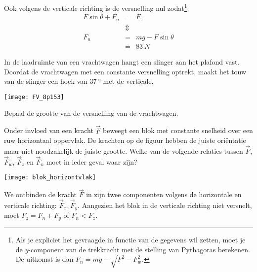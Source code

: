 \documentclass{ximera}
\begin{document}
\begin{exercise}
\begin{oplossing}
	Ook volgens de verticale richting is de versnelling nul zodat\footnote{Als je expliciet het gevraagde in functie van de gegevens wil zetten, moet je de $y$-component van de trekkracht met de stelling van Pythagoras berekenen. De uitkomst is dan $F_n=mg-\sqrt{F^2-F_w^2}$.}:
	\begin{eqnarray*}
		F\sin{\theta}+F_n&=&F_z\\
		&\Updownarrow&\\
		F_n &=& mg-F\sin{\theta}\\
		&=& \SI{83}{N}
	\end{eqnarray*}
	\end{oplossing}
\end{exercise}

\begin{exercise}
	In de laadruimte van een vrachtwagen hangt een slinger aan het plafond vast. Doordat de vrachtwagen met een constante versnelling optrekt, maakt het touw van de slinger een hoek van $\SI{37}{\degree}$ met de verticale. 
	
	\begin{image}
		\texttt{[image: FV\_8p153]}
	\end{image}
	
	Bepaal de grootte van de versnelling van de vrachtwagen.
\end{exercise}

\begin{exercise}
	Onder invloed van een kracht $\vec{F}$ beweegt een blok met constante snelheid over een ruw horizontaal oppervlak. De krachten op de figuur hebben de juiste ori\"entatie maar niet noodzakelijk de juiste grootte. Welke van de volgende relaties tussen $\vec{F}$, $\vec{F}_w$, $\vec{F}_z$ en $\vec{F}_n$ moet in ieder geval waar zijn?

	\begin{minipage}[c]{0.6\textwidth}
	\begin{multipleChoice}
	\end{multipleChoice}
	\end{minipage}
	\hfill
	\begin{image}[.35\linewidth]
			\texttt{[image: blok\_horizontvlak]}
	\end{image}

	\begin{oplossing}
	We ontbinden de kracht $\vec{F}$ in zijn twee componenten volgens de horizontale en verticale richting: $\vec{F}_x,\vec{F}_y$. Aangezien het blok in de verticale richting niet versnelt, moet $F_z=F_n+F_y$ of $F_n<F_z$.
	\end{oplossing}
\end{exercise}
\end{document}
